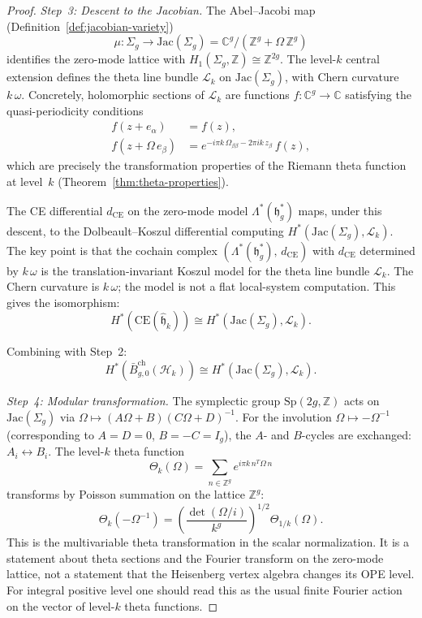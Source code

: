\begin{proof}
\emph{Step~3: Descent to the Jacobian.}
The Abel--Jacobi map (Definition~\ref{def:jacobian-variety})
\[
\mu\colon \Sigma_g \to \mathrm{Jac}(\Sigma_g)
= \mathbb{C}^g / (\mathbb{Z}^g + \Omega\,\mathbb{Z}^g)
\]
identifies the zero-mode lattice with
$H_1(\Sigma_g, \mathbb{Z}) \cong \mathbb{Z}^{2g}$.
The level-$k$ central extension defines the theta line bundle
$\mathcal{L}_k$ on $\mathrm{Jac}(\Sigma_g)$, with Chern curvature
$k\,\omega$.
Concretely, holomorphic sections of $\mathcal{L}_k$ are functions
$f\colon \mathbb{C}^g \to \mathbb{C}$ satisfying the
quasi-periodicity conditions
\begin{align}
f(z + e_\alpha) &= f(z), \\
f(z + \Omega\, e_\beta) &= e^{-i\pi k\,\Omega_{\beta\beta}
 - 2\pi i k\, z_\beta}\, f(z),
\end{align}
which are precisely the transformation properties of
the Riemann theta function at level~$k$
(Theorem~\ref{thm:theta-properties}).

The CE differential $d_{\mathrm{CE}}$ on the zero-mode model
$\Lambda^*(\mathfrak{h}_g^*)$ maps, under this descent, to the
Dolbeault--Koszul differential computing
$H^*(\mathrm{Jac}(\Sigma_g), \mathcal{L}_k)$. The key
point is that the cochain complex
$(\Lambda^*(\mathfrak{h}_g^*),\, d_{\mathrm{CE}})$ with
$d_{\mathrm{CE}}$ determined by $k\,\omega$ is the
translation-invariant Koszul model for the theta line bundle
$\mathcal{L}_k$. The Chern curvature is $k\,\omega$; the model is
not a flat local-system computation.
This gives the isomorphism:
\[
H^*(\mathrm{CE}(\hat{\mathfrak{h}}_k))
\cong H^*(\mathrm{Jac}(\Sigma_g), \mathcal{L}_k).
\]

Combining with Step~2:
\[
H^*(\bar{B}^{\mathrm{ch}}_{g,0}(\mathcal{H}_k))
\cong H^*(\mathrm{Jac}(\Sigma_g), \mathcal{L}_k).
\]

\emph{Step~4: Modular transformation.}
The symplectic group $\mathrm{Sp}(2g, \mathbb{Z})$ acts on
$\mathrm{Jac}(\Sigma_g)$ via
$\Omega \mapsto (A\Omega + B)(C\Omega + D)^{-1}$.
For the involution $\Omega \mapsto -\Omega^{-1}$
(corresponding to $A = D = 0$, $B = -C = I_g$),
the $A$- and $B$-cycles are exchanged:
$A_i \leftrightarrow B_i$. The level-$k$ theta function
\[
\Theta_k(\Omega)
= \sum_{n \in \mathbb{Z}^g} e^{i\pi k\, n^T \Omega\, n}
\]
transforms by Poisson summation on the lattice
$\mathbb{Z}^g$:
\[
\Theta_k(-\Omega^{-1})
= \left(\frac{\det(\Omega/i)}{k^g}\right)^{1/2}
 \Theta_{1/k}(\Omega).
\]
This is the multivariable theta transformation in the scalar
normalization. It is a statement about theta sections and the
Fourier transform on the zero-mode lattice, not a statement that
the Heisenberg vertex algebra changes its OPE level. For integral
positive level one should read this as the usual finite Fourier
action on the vector of level-$k$ theta functions.


\end{proof}
